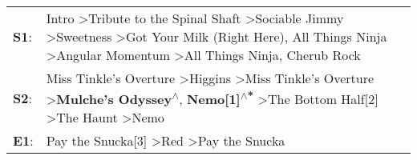 \begin{supertabular}{p{0.03\textwidth}p{0.92\textwidth}}
 \textbf{S1}:  &  Intro\textsuperscript{} \textgreater \enspace Tribute to the Spinal Shaft\textsuperscript{} \textgreater \enspace Sociable Jimmy\textsuperscript{} \textgreater \enspace Sweetness\textsuperscript{} \textgreater \enspace Got Your Milk (Right Here)\textsuperscript{}, \enspace All Things Ninja\textsuperscript{} \textgreater \enspace Angular Momentum\textsuperscript{} \textgreater \enspace All Things Ninja\textsuperscript{}, \enspace Cherub Rock\textsuperscript{}  \enspace  \\
 \textbf{S2}:  &                               Miss Tinkle's Overture\textsuperscript{} \textgreater \enspace Higgins\textsuperscript{} \textgreater \enspace Miss Tinkle's Overture\textsuperscript{} \textgreater \enspace \textbf{Mulche's Odyssey\textsuperscript{$\wedge$}}, \enspace \textbf{Nemo[1]\textsuperscript{$\wedge$*}} \textgreater \enspace The Bottom Half[2]\textsuperscript{} \textgreater \enspace The Haunt\textsuperscript{} \textgreater \enspace Nemo\textsuperscript{}  \enspace  \\
 \textbf{E1}:  &                                                                                                                                                                                                                                                                                                                                          Pay the Snucka[3]\textsuperscript{} \textgreater \enspace Red\textsuperscript{} \textgreater \enspace Pay the Snucka\textsuperscript{}  \enspace  \\
\end{supertabular}
